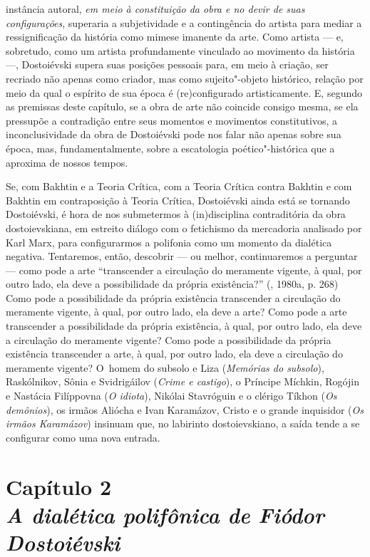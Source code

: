 instância autoral, \emph{em meio à constituição da obra e no devir de
suas configurações}, superaria a subjetividade e a contingência do
artista para mediar a ressignificação da história como mimese imanente
da arte. Como artista --- e, sobretudo, como um artista profundamente
vinculado ao movimento da história ---, Dostoiévski supera suas posições
pessoais para, em meio à criação, ser recriado não apenas como criador,
mas como sujeito"-objeto histórico, relação por meio da qual o espírito
de sua época é (re)configurado artisticamente. E, segundo as premissas
deste capítulo, se a obra de arte não coincide consigo mesma, se ela
pressupõe a contradição entre seus momentos e movimentos constitutivos,
a inconclusividade da obra de Dostoiévski pode nos falar não apenas
sobre sua época, mas, fundamentalmente, sobre a escatologia
poético"-histórica que a aproxima de nossos tempos.

Se, com Bakhtin e a Teoria Crítica, com a Teoria Crítica contra Bakhtin
e com Bakhtin em contraposição à Teoria Crítica, Dostoiévski ainda está
se tornando Dostoiévski, é hora de nos submetermos à (in)disciplina
contraditória da obra dostoievskiana, em estreito diálogo com o
fetichismo da mercadoria analisado por Karl Marx, para configurarmos a
polifonia como um momento da dialética negativa. Tentaremos, então,
descobrir --- ou melhor, continuaremos a perguntar --- como pode a arte
``transcender a circulação do meramente vigente, à qual, por outro lado,
ela deve a possibilidade da própria existência?'' (, 1980a, p.
268) Como pode a possibilidade da própria existência transcender a
circulação do meramente vigente, à qual, por outro lado, ela deve a
arte? Como pode a arte transcender a possibilidade da própria
existência, à qual, por outro lado, ela deve a circulação do meramente
vigente? Como pode a possibilidade da própria existência transcender a
arte, à qual, por outro lado, ela deve a circulação do meramente
vigente? O~homem do subsolo e Liza (\emph{Memórias do subsolo}),
Raskólnikov, Sônia e Svidrigáilov (\emph{Crime e castigo}), o Príncipe
Míchkin, Rogójin e Nastácia Filíppovna (\emph{O idiota}), Nikólai
Stavróguin e o clérigo Tíkhon (\emph{Os demônios}), os irmãos Aliócha e
Ivan Karamázov, Cristo e o grande inquisidor (\emph{Os irmãos
Karamázov}) insinuam que, no labirinto dostoievskiano, a saída tende a
se configurar como uma nova entrada.

\chapter*{Capítulo 2\\
\bigskip
\emph{A dialética polifônica de Fiódor Dostoiévski}}

